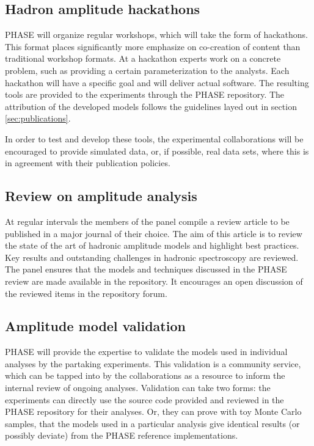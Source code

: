 \subsection{Hadron amplitude hackathons}
\label{sec:hackathon}
PHASE will organize regular workshops, which will take the form of hackathons. This format places significantly more emphasize on co-creation of content than traditional workshop formats. At a hackathon experts work on a concrete problem, such as providing a certain parameterization to the analysts. Each hackathon will have a specific goal and will deliver actual software. The resulting tools are provided to the experiments through the PHASE repository. The attribution of the developed models follows the guidelines layed out in section \ref{sec:publications}.

In order to test and develop these tools, the experimental collaborations will be encouraged to provide simulated data, or, if possible, real data sets, where this is in agreement with their publication policies.


\subsection{Review on amplitude analysis}
\label{rec:review}
At regular intervals the members of the panel compile a review article to be published in a major journal of their choice. The aim of this article is to review the state of the art of hadronic amplitude models and highlight best practices. Key results and outstanding challenges in hadronic spectroscopy are reviewed. The panel ensures that the models and techniques discussed in the PHASE review are made available in the repository. It encourages an open discussion of the reviewed items in the repository forum.

\subsection{Amplitude model validation}
\label{sec:validation}
PHASE will provide the expertise to validate the models used in individual analyses by the partaking experiments. This validation is a community service, which can be tapped into by the collaborations as a resource to inform the internal review of ongoing analyses. Validation can take two forms: the experiments can directly use the source code provided and reviewed in the PHASE repository for their analyses. Or, they can prove with toy Monte Carlo samples, that the models used in a particular analysis give identical results (or possibly deviate) from the PHASE reference implementations.

